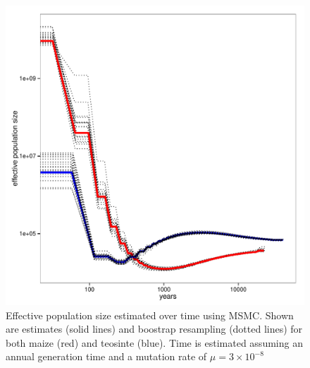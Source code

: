 \begin{figure}
  \begin{center}
    \includegraphics[width=.85\textwidth]{FigsAndFiles/TIL_BKN_bootstrapping_msmc.pdf}
    \end{center}
\caption{Effective population size estimated over time using MSMC. Shown are estimates (solid lines) and boostrap resampling (dotted lines) for both maize (red) and teosinte (blue). Time is estimated assuming an annual generation time and a mutation rate of $\mu=3\times 10^{-8}$ \label{sFig:msmc}}
\end{figure}
\clearpage

